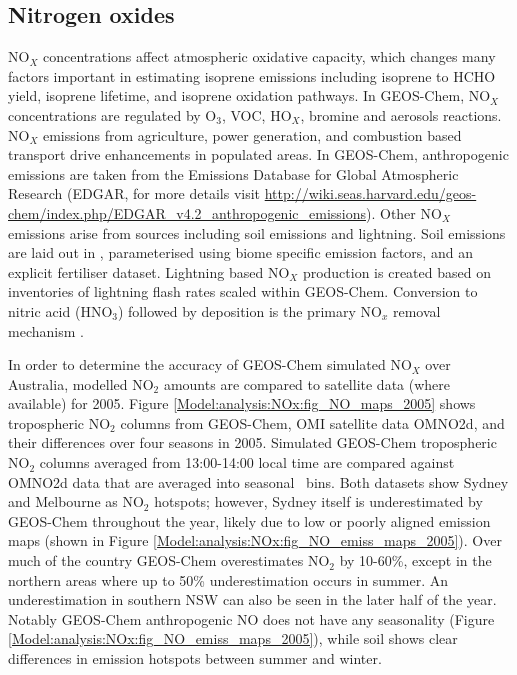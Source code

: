   \subsection{Nitrogen oxides}
    \label{Model:GC:NOx}
    NO$_X$ concentrations affect atmospheric oxidative capacity, which changes many factors important in estimating isoprene emissions including isoprene to HCHO yield, isoprene lifetime, and isoprene oxidation pathways.
    In GEOS-Chem, NO$_X$ concentrations are regulated by O$_3$, VOC, HO$_X$, bromine and aerosols reactions.
    NO$_X$ emissions from agriculture, power generation, and combustion based transport drive enhancements in populated areas.
    In GEOS-Chem, anthropogenic emissions are taken from the Emissions Database for Global Atmospheric Research (EDGAR, for more details visit \url{http://wiki.seas.harvard.edu/geos-chem/index.php/EDGAR_v4.2_anthropogenic_emissions}).
    Other NO$_X$ emissions arise from sources including soil emissions %
    and lightning.
    Soil emissions are laid out in \textcite{Hudman2012}, parameterised using biome specific emission factors, and an explicit fertiliser dataset.
    Lightning based NO$_X$ production is created based on inventories of lightning flash rates scaled within GEOS-Chem.
    Conversion to nitric acid (HNO$_3$) followed by deposition is the primary NO$_x$ removal mechanism \parencite{Delmas1997, Ayers2006}.
    
    In order to determine the accuracy of GEOS-Chem simulated NO$_X$ over Australia, modelled NO$_2$ amounts are compared to satellite data (where available) for 2005.
    Figure \ref{Model:analysis:NOx:fig_NO_maps_2005} shows tropospheric NO$_2$ columns from GEOS-Chem, OMI satellite data OMNO2d, and their differences over four seasons in 2005.
    Simulated GEOS-Chem tropospheric NO$_2$ columns averaged from 13:00-14:00 local time are compared against OMNO2d data that are averaged into seasonal \lowhr ~bins. %
    Both datasets show Sydney and Melbourne as NO$_2$ hotspots; however, Sydney itself is underestimated by GEOS-Chem throughout the year, likely due to low or poorly aligned emission maps (shown in Figure \ref{Model:analysis:NOx:fig_NO_emiss_maps_2005}).
    Over much of the country GEOS-Chem overestimates NO$_2$ by 10-60\%, except in the northern areas where up to 50\% underestimation occurs in summer.
    An underestimation in southern NSW can also be seen in the later half of the year.
    Notably GEOS-Chem anthropogenic NO does not have any seasonality (Figure \ref{Model:analysis:NOx:fig_NO_emiss_maps_2005}), while soil shows clear differences in emission hotspots between summer and winter.
    
